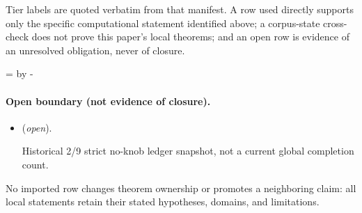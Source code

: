 \documentclass[11pt,a4paper]{article}
\theoremstyle{definition}
\theoremstyle{remark}
\begin{document}
Tier labels are quoted verbatim from that manifest. A row used directly supports only the specific computational statement identified above; a corpus-state cross-check does not prove this paper's local theorems; and an open row is evidence of an unresolved obligation, never of closure.

\par\begingroup{}=\pagegoal\advance{} by -\pagetotal\ifdim\dimen0<7\baselineskip\newpage\fi\endgroup
\paragraph{Open boundary (not evidence of closure).}
\begin{itemize}
\setlength{\itemsep}{0.25em}
\item {} (\emph{open}).\par Historical 2/9
strict no-knob ledger snapshot, not a current global completion count.
\end{itemize}

No imported row changes theorem ownership or promotes a neighboring claim: all local statements retain their stated hypotheses, domains, and limitations.
\end{document}
